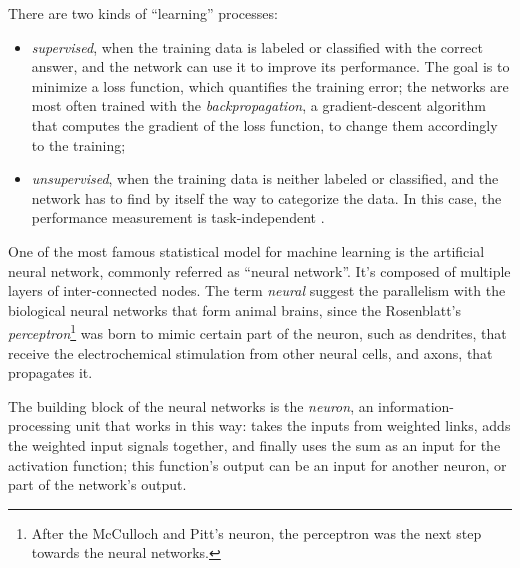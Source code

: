 There are two kinds of ``learning'' processes:
\begin{itemize}
	\item \textit{supervised}, when the training data is labeled or classified with the correct answer, and the network can use it to improve its performance. The goal is to minimize a loss function, which quantifies the training error; the networks are most often trained with the \textit{backpropagation}, a gradient-descent algorithm that computes the gradient of the loss function, to change them accordingly to the training;
	\item \textit{unsupervised}, when the training data is neither labeled or classified, and the network has to find by itself the way to categorize the data. In this case, the performance measurement is task-independent \cite{Hay08}.
\end{itemize}

One of the most famous statistical model for machine learning is the artificial neural network, commonly referred as ``neural network''. It's composed of multiple layers of inter-connected nodes. The term \textit{neural} suggest the parallelism with the biological neural networks that form animal brains, since the Rosenblatt's \textit{perceptron}\footnote{After the McCulloch and Pitt’s neuron, the perceptron was the next step towards the neural networks.} was born to mimic certain part of the neuron, such as dendrites, that receive the electrochemical stimulation from other neural cells, and axons, that propagates it.

The building block of the neural networks is the \textit{neuron}, an information-processing unit that works in this way: takes the inputs from weighted links, adds the weighted input signals together, and finally uses the sum as an input for the activation function; this function's output can be an input for another neuron, or part of the network's output.

